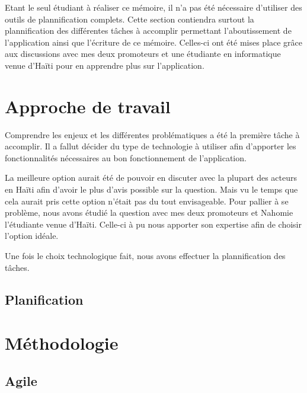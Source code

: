 \documentclass{EPL-master-thesis-covers-FR}
\begin{document}
		Etant le seul étudiant à réaliser ce mémoire, il n'a pas été nécessaire d'utiliser des outils de plannification complets. Cette section contiendra surtout la plannification des différentes tâches à accomplir permettant l'aboutissement de l'application ainsi que l'écriture de ce mémoire. Celles-ci ont été mises place grâce aux discussions avec mes deux promoteurs et une étudiante en informatique venue d'Haïti pour en apprendre plus sur l'application. 

		\section{Approche de travail}
			Comprendre les enjeux et les différentes problématiques a été la première tâche à accomplir. Il a fallut décider du type de technologie à utiliser afin d'apporter les fonctionnalités nécessaires au bon fonctionnement de l'application. 
			
			La meilleure option aurait été de pouvoir en discuter avec la plupart des acteurs en Haïti afin d'avoir le plus d'avis possible sur la question. Mais vu le temps que cela aurait pris cette option n'était pas du tout envisageable. Pour pallier à se problème, nous avons étudié la question avec mes deux promoteurs et Nahomie l'étudiante venue d'Haïti. Celle-ci à pu nous apporter son expertise afin de choisir l'option idéale.
			
			Une fois le choix technologique fait, nous avons effectuer la plannification des tâches.
		
		


			\subsection*{Planification}
				\label{sec:planification}

		\section{Méthodologie}


			\subsection*{Agile}
			
\end{document}
